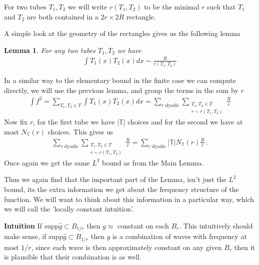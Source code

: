 \documentclass[12pt]{amsart}
\newtheorem{lemma}[theorem]{Lemma}
\newcommand{\spp}{\textrm{supp}}
\newcommand{\TT}{\mathbb{T}}
\begin{document}
\begin{minipage}{0.6 \textwidth}
For two tubes $T_1, T_2$ we will write $r(T_1, T_2)$ to be the minimal $r$ such that $T_1$ and $T_2$ are both contained in a $2r \times 2R$ rectangle.

A simple look at the geometry of the rectangles gives us the following lemma
\begin{lemma}
    For any two tubes $T_1,T_2$ we have
    \begin{align*}
        \int T_1 (x) T_2 (x) dx \sim \frac{R}{r(T_1,T_2)}
    \end{align*}
\end{lemma}
\end{minipage}
\hspace{0.02\textwidth}
\begin{minipage}{0.38 \textwidth} 

\end{minipage}
\newline

In a similar way to the elementary bound in the finite case we can compute directly, we will use the previous lemma, and group the terms in the sum by $r$
\begin{align*}
    \int f^2 = \sum_{T_1, T_2 \in T} \int T_1 (x) T_2 (x) d x = \sum_{r \text{ dyadic}} \sum_{\substack{T_1, T_2 \in T\\ r \sim r(T_1,T_2) }} \frac{R}{r}
\end{align*}
Now fix $r$, for the first tube we have $|\TT|$ choices and for the second we have at most $N_\TT (r)$ choices. This gives us 
\begin{align*}
    \sum_{r \text{ dyadic}} \sum_{\substack{T_1, T_2 \in T\\ r \sim r(T_1,T_2) }} \frac{R}{r} =  \sum_{r \text{ dyadic}} |\TT| N_\TT (r) \frac{R}{r}\, .
\end{align*}
Once again we get the same $L^2$ bound as from the Main Lemma. 

Thus we again find that the important part of the Lemma, isn't just the $L^2$ bound, its the extra information we get about the frequency structure of the function. We will want to think about this information in a particular way, which we will call the 'locally constant intuition'. 

\textbf{Intuition} If $\spp \hat{g} \subset B_{1/r}$ then $g \approx$ constant on each $B_r$. 
This intuitively should make sense, if $\spp \hat{g} \subset B_{1/r}$ then $g$ is a combination of waves with frequency at most $1/r$, since each wave is then approximately constant on any given $B_r$ then it is plausible that their combination is as well.
\end{document}
